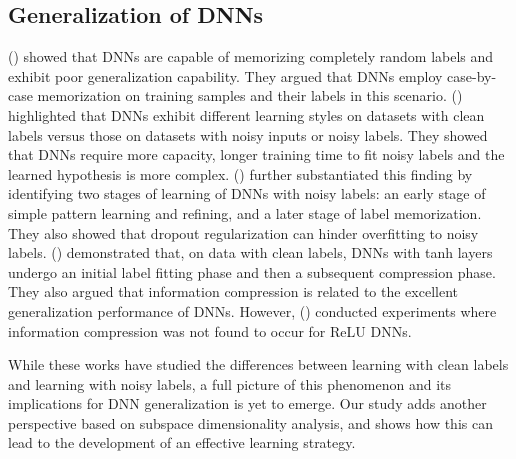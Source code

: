 \documentclass{article}
\begin{document}
\subsection{Generalization of DNNs}
\citeauthor{zhang2016understanding} (\citeyear{zhang2016understanding}) showed that DNNs are capable of memorizing completely random labels and exhibit poor generalization capability. They argued that DNNs employ case-by-case memorization on training samples and their labels in this scenario.
\citeauthor{krueger2017deep} (\citeyear{krueger2017deep}) highlighted that DNNs exhibit different learning styles on datasets with clean labels versus those on datasets with noisy inputs or noisy labels. They showed that DNNs require more capacity, longer training time to fit noisy labels and the learned hypothesis is more complex. \citeauthor{arpit2017closer} (\citeyear{arpit2017closer}) further substantiated this finding by identifying two stages of learning of DNNs with noisy labels: an early stage of simple pattern learning and refining, and a later stage of label memorization. They also showed that dropout regularization can hinder overfitting to noisy labels. \citeauthor{shwartz2017opening} (\citeyear{shwartz2017opening}) demonstrated that, on data with clean labels, DNNs with tanh layers undergo an initial label fitting phase and then a subsequent compression phase. They also argued that information compression is related to the excellent generalization performance of DNNs. However, \citeauthor{michael2018on} (\citeyear{michael2018on}) conducted experiments where information compression was not found to occur for ReLU \cite{glorot2011deep} DNNs.

While these works have studied the differences between learning with clean labels and learning with noisy labels, a full picture of this phenomenon and its implications for DNN generalization is yet to emerge.   Our study adds another perspective based on subspace dimensionality analysis, and shows how this can lead to the development of an effective learning strategy.   
\end{document}
